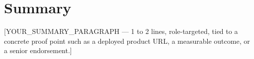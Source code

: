 \documentclass[11pt,a4paper,sans]{moderncv}
\begin{document}
\makecvtitle
\vspace*{-2em}
\pagestyle{empty}

%
\vspace{-0.5em}
\section{Summary}
[YOUR_SUMMARY_PARAGRAPH --- 1 to 2 lines, role-targeted, tied to a concrete proof point such as a deployed product URL, a measurable outcome, or a senior endorsement.]
\vspace{-0.6em}

%
%
%
\end{document}
